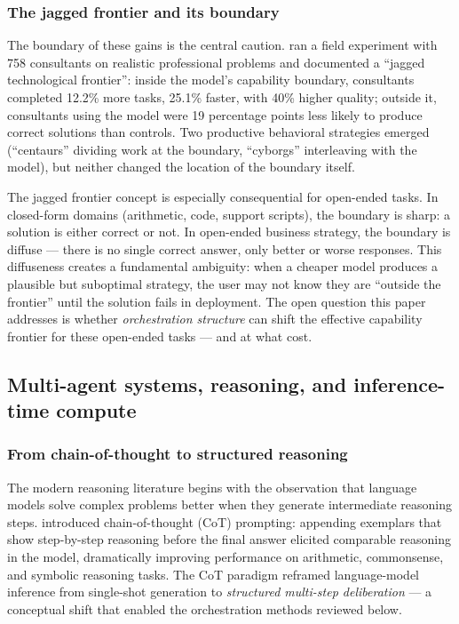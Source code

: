 \documentclass[12pt,a4paper]{article}
\begin{document}
\subsubsection{The jagged frontier and its boundary}

The boundary of these gains is the central caution. \citet{DellAcquaEtAl2023}
ran a field experiment with 758 consultants on realistic professional problems
and documented a ``jagged technological frontier'': inside the model's
capability boundary, consultants completed 12.2\% more tasks, 25.1\% faster,
with 40\% higher quality; outside it, consultants using the model were 19
percentage points less likely to produce correct solutions than controls. Two
productive behavioral strategies emerged (``centaurs'' dividing work at the
boundary, ``cyborgs'' interleaving with the model), but neither changed the
location of the boundary itself.

The jagged frontier concept is especially consequential for open-ended tasks.
In closed-form domains (arithmetic, code, support scripts), the boundary is
sharp: a solution is either correct or not. In open-ended business strategy,
the boundary is diffuse --- there is no single correct answer, only better or
worse responses. This diffuseness creates a fundamental ambiguity: when a cheaper
model produces a plausible but suboptimal strategy, the user may not know they
are ``outside the frontier'' until the solution fails in deployment. The open
question this paper addresses is whether \emph{orchestration structure} can
shift the effective capability frontier for these open-ended tasks --- and at
what cost.

\subsection{Multi-agent systems, reasoning, and inference-time compute}

\subsubsection{From chain-of-thought to structured reasoning}

The modern reasoning literature begins with the observation that language models
solve complex problems better when they generate intermediate reasoning steps.
\citet{WeiEtAl2022} introduced chain-of-thought (CoT) prompting: appending
exemplars that show step-by-step reasoning before the final answer elicited
comparable reasoning in the model, dramatically improving performance on
arithmetic, commonsense, and symbolic reasoning tasks. The CoT paradigm
reframed language-model inference from single-shot generation to
\emph{structured multi-step deliberation} --- a conceptual shift that enabled
the orchestration methods reviewed below.
\end{document}
